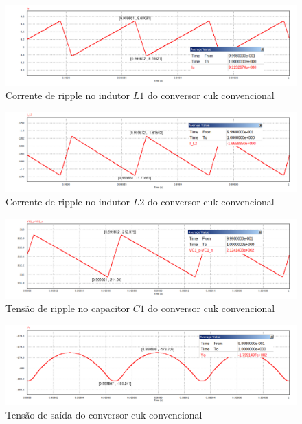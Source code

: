 \documentclass[
	12pt,				%
	openany,
	onseside,
	a4paper,			%
	english,			%
	french,				%
	spanish,			%
	brazil,				%
	]{abntex2}
\begin{document}
\begin{figure}[htb]%
	\centering
		\includegraphics[width= \linewidth]{cuk_conv_ripp_I_L1}
		\caption{Corrente de ripple no indutor $L1$ do conversor cuk convencional}
		\label{fig:cuk_conv_ripp_I_L1}
\end{figure}

\begin{figure}[htb]%
	\centering
		\includegraphics[width= \linewidth]{cuk_conv_ripp_I_L2}
		\caption{Corrente de ripple no indutor $L2$ do conversor cuk convencional}
		\label{fig:cuk_conv_ripp_I_L2}
\end{figure}

\begin{figure}[H]%
	\centering
		\includegraphics[width= \linewidth]{cuk_conv_ripp_V_C1}
		\caption{Tensão de ripple no capacitor $C1$ do conversor cuk convencional}
		\label{fig:cuk_conv_ripp_V_C1}
\end{figure}


\begin{figure}[H]%
	\centering
		\includegraphics[width= \linewidth]{cuk_conv_ripp_V_out2}
		\caption{Tensão de saída do conversor cuk convencional}
		\label{fig:cuk_conv_ripp_V_out_}
\end{figure}
\end{document}
